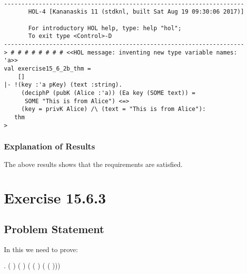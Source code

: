 \documentclass{report}
\begin{document}
\setcounter{sessioncount}{0}
\begin{session}
  \begin{scriptsize}
\begin{verbatim}

---------------------------------------------------------------------
       HOL-4 [Kananaskis 11 (stdknl, built Sat Aug 19 09:30:06 2017)]

       For introductory HOL help, type: help "hol";
       To exit type <Control>-D
---------------------------------------------------------------------
> # # # # # # # # <<HOL message: inventing new type variable names: 'a>>
val exercise15_6_2b_thm =
    []
|- !(key :'a pKey) (text :string).
     (deciphP (pubK (Alice :'a)) (Ea key (SOME text)) =
      SOME "This is from Alice") <=>
     (key = privK Alice) /\ (text = "This is from Alice"):
   thm
> 

\end{verbatim}
  \end{scriptsize}
\end{session}

\subsection{Explanation of Results}
\label{sec:explanation-results-2b}
The above results shows that the requirements are satisfied.





 \chapter{Exercise 15.6.3}
 \label{cha:exercise-15.6.3}
  
 \section{Problem Statement}
 \label{sec:problem-statement-3}
In this we need to prove:  

\HOLTokenTurnstile{} \HOLSymConst{\HOLTokenForall{}}.
      ( ) 
       ( ) \HOLSymConst{\HOLTokenEquiv{}}
     ( \HOLSymConst{=}
       ( ) ( ( )))
\end{document}
